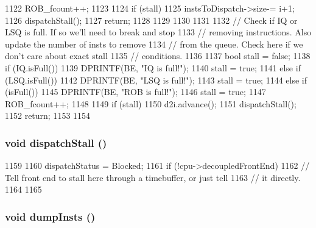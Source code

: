 \begin{DoxyCode}
{{{{1122                 ROB_fcount++;
1123             }
1124             if (stall) {
1125                 instsToDispatch->size-= i+1;
1126                 dispatchStall();
1127                 return;
1128             }
1129         }
1130     }
1131 
1132     // Check if IQ or LSQ is full.  If so we'll need to break and stop
1133     // removing instructions.  Also update the number of insts to remove
1134     // from the queue.  Check here if we don't care about exact stall
1135     // conditions.
1136 
1137     bool stall = false;
1138     if (IQ.isFull()) {
1139         DPRINTF(BE, "IQ is full!\n");
1140         stall = true;
1141     } else if (LSQ.isFull()) {
1142         DPRINTF(BE, "LSQ is full!\n");
1143         stall = true;
1144     } else if (isFull()) {
1145         DPRINTF(BE, "ROB is full!\n");
1146         stall = true;
1147         ROB_fcount++;
1148     }
1149     if (stall) {
1150         d2i.advance();
1151         dispatchStall();
1152         return;
1153     }
1154 }
\end{DoxyCode}
\hypertarget{classBackEnd_a3a69629e2b050560eb983bdedffc30ba}{
\subsubsection[{dispatchStall}]{\setlength{\rightskip}{0pt plus 5cm}void dispatchStall ()}}
\label{classBackEnd_a3a69629e2b050560eb983bdedffc30ba}



\begin{DoxyCode}
1159 {
1160     dispatchStatus = Blocked;
1161     if (!cpu->decoupledFrontEnd) {
1162         // Tell front end to stall here through a timebuffer, or just tell
1163         // it directly.
1164     }
1165 }
\end{DoxyCode}
\hypertarget{classBackEnd_a80587b4fe043bbe1995536cb3b361588}{
\subsubsection[{dumpInsts}]{\setlength{\rightskip}{0pt plus 5cm}void dumpInsts ()}}
\label{classBackEnd_a80587b4fe043bbe1995536cb3b361588}



